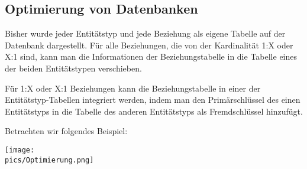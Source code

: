 \subsection[Optimierung]{Optimierung von Datenbanken}
Bisher wurde jeder Entitätstyp und jede Beziehung als eigene Tabelle auf der Datenbank dargestellt. Für alle Beziehungen, die von der Kardinalität 1:X oder X:1 sind, kann man die Informationen der Beziehungstabelle in die Tabelle eines der beiden Entitätstypen verschieben.
\begin{tcolorbox}[title=Optimierung]
	Für 1:X oder X:1 Beziehungen kann die Beziehungstabelle in einer der Entitätstyp-Tabellen integriert werden, indem man den Primärschlüssel des einen Entitätstyps in die Tabelle des anderen Entitätstyps als Fremdschlüssel hinzufügt.
\end{tcolorbox}
Betrachten wir folgendes Beispiel:
\begin{minipage}{\textwidth}
	\centering\texttt{[image: \\pics/Optimierung.png]}
\end{minipage}

